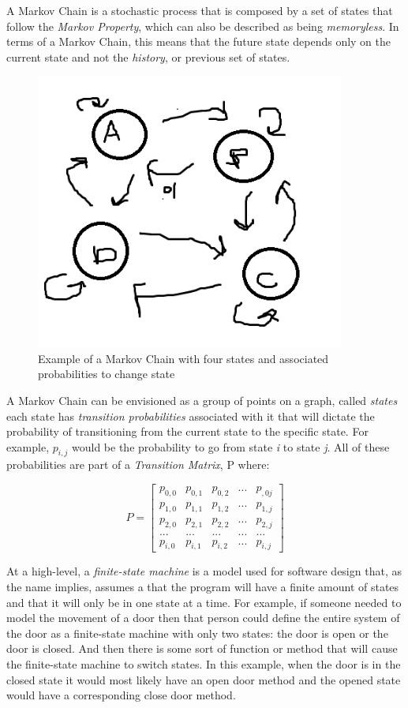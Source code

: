 \documentclass{article}
\begin{document}
A Markov Chain is a stochastic process that is composed by a set of states that follow the \textit{Markov Property}, which can also be described as being \textit{memoryless}.  In terms of a Markov Chain, this means that the future state depends only on the current state and not the \textit{history}, or previous set of states.

\begin{figure}
    \centering
    \includegraphics[width=4.0in]{betamarkovchain}
    \caption{Example of a Markov Chain with four states and associated probabilities to change state}
    \label{example_markov_chain}
\end{figure}

A Markov Chain can be envisioned as a group of points on a graph, called \textit{states} each state has \textit{transition probabilities} associated with it that will dictate the probability of transitioning from the current state to the specific state.  For example,  $p_{i,j}$ would be the probability to go from state \textit{i} to state \textit{j}.  All of these probabilities are part of a \textit{Transition Matrix}, P where:

$$
P=
\begin{bmatrix}
p_{0,0} & p_{0,1} & p_{0,2} & ... & p_{,0j}\\
p_{1,0} & p_{1,1} & p_{1,2} & ... & p_{1,j}\\
p_{2,0} & p_{2,1} & p_{2,2} & ... & p_{2,j}\\
... & ... & ... & ... & ...\\
p_{i,0} & p_{i,1} & p_{i,2} & ... & p_{i,j}
\end{bmatrix}
$$

At a high-level, a \textit{finite-state machine} is a model used for software design that, as the name implies, assumes a that the program will have a finite amount of states and that it will only be in one state at a time.  For example, if someone needed to model the movement of a door then that person could define the entire system of the door as a finite-state machine with only two states: the door is open or the door is closed.  And then there is some sort of function or method that will cause the finite-state machine to switch states.  In this example, when the door is in the closed state it would most likely have an open door method and the opened state would have a corresponding close door method.
\end{document}
